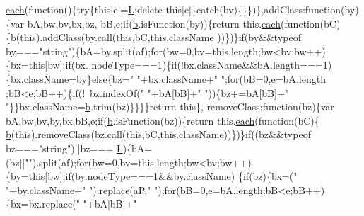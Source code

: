 \begin{DoxyCode}
      \hyperlink{a00039_a871ff39db627c54c710a3e9909b8234c}{each}(\textcolor{keyword}{function}()\{\textcolor{keywordflow}{try}\{\textcolor{keyword}{this}[e]=\hyperlink{a00039_a38ee4c0b5f4fe2a18d0c783af540d253}{L};\textcolor{keyword}{delete} \textcolor{keyword}{this}[e]\}\textcolor{keywordflow}{catch}(bv)\{\}\})\},addClass:\textcolor{keyword}{function}(by)\{var bA,bw,bv,bx,bz,
      bB,e;\textcolor{keywordflow}{if}(\hyperlink{a00039_aa4026ad5544b958e54ce5e106fa1c805}{b}.isFunction(by))\{\textcolor{keywordflow}{return} this.\hyperlink{a00039_a871ff39db627c54c710a3e9909b8234c}{each}(\textcolor{keyword}{function}(bC)\{\hyperlink{a00039_aa4026ad5544b958e54ce5e106fa1c805}{b}(\textcolor{keyword}{this}).addClass(by.call(\textcolor{keyword}{this},bC,\textcolor{keyword}{this}.className
      ))\})\}\textcolor{keywordflow}{if}(by&&typeof by===\textcolor{stringliteral}{"string"})\{bA=by.split(af);\textcolor{keywordflow}{for}(bw=0,bv=this.length;bw<bv;bw++)\{bx=\textcolor{keyword}{this}[bw];\textcolor{keywordflow}{if}(bx.
      nodeType===1)\{\textcolor{keywordflow}{if}(!bx.className&&bA.length===1)\{bx.className=by\}\textcolor{keywordflow}{else}\{bz=\textcolor{stringliteral}{" "}+bx.className+\textcolor{stringliteral}{" "};\textcolor{keywordflow}{for}(bB=0,e=bA.length
      ;bB<e;bB++)\{\textcolor{keywordflow}{if}(!~bz.indexOf(\textcolor{stringliteral}{" "}+bA[bB]+\textcolor{stringliteral}{" "}))\{bz+=bA[bB]+\textcolor{stringliteral}{" "}\}\}bx.className=\hyperlink{a00039_aa4026ad5544b958e54ce5e106fa1c805}{b}.trim(bz)\}\}\}\}\textcolor{keywordflow}{return} \textcolor{keyword}{this}\},
      removeClass:\textcolor{keyword}{function}(bz)\{var bA,bw,bv,by,bx,bB,e;\textcolor{keywordflow}{if}(\hyperlink{a00039_aa4026ad5544b958e54ce5e106fa1c805}{b}.isFunction(bz))\{\textcolor{keywordflow}{return} this.\hyperlink{a00039_a871ff39db627c54c710a3e9909b8234c}{each}(\textcolor{keyword}{function}(bC)\{
      \hyperlink{a00039_aa4026ad5544b958e54ce5e106fa1c805}{b}(\textcolor{keyword}{this}).removeClass(bz.call(\textcolor{keyword}{this},bC,\textcolor{keyword}{this}.className))\})\}\textcolor{keywordflow}{if}((bz&&typeof bz===\textcolor{stringliteral}{"string"})||bz===
      \hyperlink{a00039_a38ee4c0b5f4fe2a18d0c783af540d253}{L})\{bA=(bz||\textcolor{stringliteral}{""}).split(af);\textcolor{keywordflow}{for}(bw=0,bv=this.length;bw<bv;bw++)\{by=\textcolor{keyword}{this}[bw];\textcolor{keywordflow}{if}(by.nodeType===1&&by.className)
      \{\textcolor{keywordflow}{if}(bz)\{bx=(\textcolor{stringliteral}{" "}+by.className+\textcolor{stringliteral}{" "}).replace(aP,\textcolor{stringliteral}{" "});\textcolor{keywordflow}{for}(bB=0,e=bA.length;bB<e;bB++)\{bx=bx.replace(\textcolor{stringliteral}{" "}+bA[bB]+\textcolor{stringliteral}{"
}
\end{DoxyCode}
